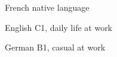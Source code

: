 

\begin{cvpairs}

  
\cvpair
    {French} %
    {native language} %


\cvpair
    {English} %
    {C1, daily life at work} %


\cvpair
    {German} %
    {B1, casual at work} %

\end{cvpairs}